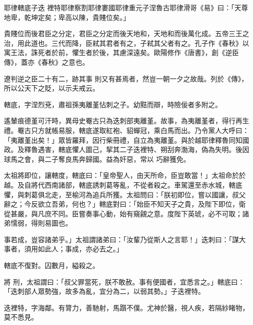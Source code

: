 
\begin{pinyinscope}

 耶律轄底子迭
 裡特耶律察割耶律婁國耶律重元子涅魯古耶律滑哥《易》曰：「天尊地卑，乾坤定矣；卑高以陳，貴賤位矣。」



 貴賤位而後君臣之分定，君臣之分定而後天地和，天地和而後萬化成。五帝三王之治，用此道也。三代而降，臣弒其君者有之，子弒其父者有之。孔子作《春秋》以寓王法，誅死者於前，懼生者於後，其慮深遠矣。歐陽修作《唐書》，創《逆臣傳》，蓋亦《春秋》之意也。



 遼判逆之臣二十有二，跡其事
 則又有甚焉者，然豈一朝一夕之故哉。列於《傳》，所以公天下之貶，以示夫戒云。



 轄底，字涅烈兗，肅祖孫夷離堇怗刺之子。幼黠而辯，時險佞者多附之。



 遙輦痕德堇可汗時，異母史罨古只為迭刺部夷離堇。故事，為夷離堇者，得行再生禮。罨古只方就帳易服，轄底遂取紅袍、貂蟬冠，乘白馬而出。乃令黨人大呼曰：「夷離堇出矣！」眾皆羅拜，因行柴冊禮，自立為夷離堇。與於越耶律釋魯同知國政。及釋魯遇害，轄底懼人圖己，挈其二子迭裡特、朔刮奔渤海，偽為失明。後因球馬之會，與二子奪良馬奔歸國。益為奸惡，常以
 巧辭獲免。



 太祖將即位，讓轄度，轄底曰：「皇帝聖人，由天所命，臣豈敢當！」太祖命於於越。及自將代西南諸部，轄底誘刺葛等亂，不從者殺之。車駕還至赤水城，轄底懼，與刺葛俱北走，至榆河為追兵所獲。太祖問曰：「朕初即位，嘗以國讓，叔父辭之；今反欲立吾弟，何也？」轄底對曰：「始臣不知天子之貴，及陛下即位，衛從甚嚴，與凡庶不同。臣嘗奏事心動，始有窺覦之意。度陛下英琥，必不可取；諸弟懦弱，得則易圖也。



 事若成，豈容諸弟乎。」太祖謂諸弟曰：「汝輩乃從斯人之言耶！」迭刺曰：「謀大事者，須用如此人；事成，亦必去之。」



 轄底不復對。囚數月，縊殺之。



 將
 刑，太祖謂曰：「叔父罪當死，朕不敢赦。事有便國者，宜悉言之。」轄底曰：「迭刺部人眾勢強，故多為亂，宜分為二，以弱其勢。」子迭裡特。



 迭裡特，字海鄰。有膂力，善馳射，馬躓不僕。尤神於醫，視人疾，若隔紗睹物，莫不悉見。




\end{pinyinscope}
